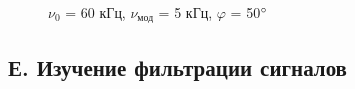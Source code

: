 \documentclass[a4paper,12pt]{article}
\begin{document}
\begin{enumerate}
\newpage




\begin{figure}[h]
\begin{minipage}[h]{0.44\linewidth}
 $\nu_0$ = 60 кГц, $\nu_\text{мод}$ = 5 кГц, $\varphi$ = 50$\degree$  \\
\end{minipage}
\label{ris:experimentalcorrelationsignals}
\end{figure}




\end{enumerate}


\newpage










\subsection*{Е. Изучение фильтрации сигналов}
\end{document}
